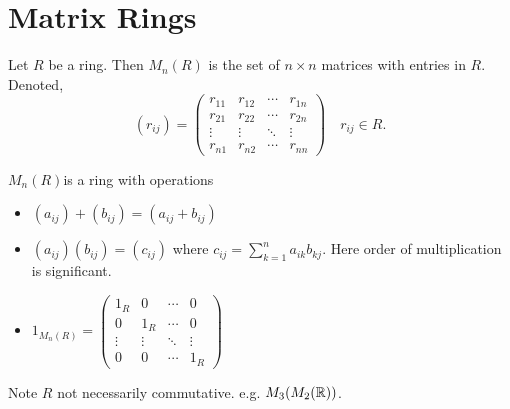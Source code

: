 \section{Matrix Rings}

Let \(R\) be a ring. Then \(M_n(R)\) is the set of \(n \times n\) matrices with entries in \(R\). Denoted,
\[(r_{ij}) = \begin{pmatrix}
    r_{11} & r_{12} & \cdots & r_{1n} \\
    r_{21} & r_{22} & \cdots & r_{2n} \\
    \vdots & \vdots & \ddots & \vdots \\
    r_{n1} & r_{n2} & \cdots & r_{nn}
\end{pmatrix} \quad r_{ij} \in R.\]

\begin{proposition}
    \(M_n(R)\)is a ring with operations
    \begin{itemize}
        \item \((a_{ij}) + (b_{ij}) = (a_{ij} + b_{ij})\)
        \item \((a_{ij})(b_{ij}) = (c_{ij})\) where \(c_{ij} = \sum_{k = 1}^n a_{ik}b_{kj}\). Here order of multiplication is significant.
        \item \(1_{M_n{(R)}} = \begin{pmatrix}
            1_R & 0 & \cdots & 0 \\
            0 & 1_R & \cdots & 0 \\
            \vdots & \vdots & \ddots & \vdots \\
            0 & 0 & \cdots & 1_R
        \end{pmatrix}\)
    \end{itemize}
    Note \(R\) not necessarily commutative. e.g. \(M_3(M_2(\mathbb{R}))\).
\end{proposition}

